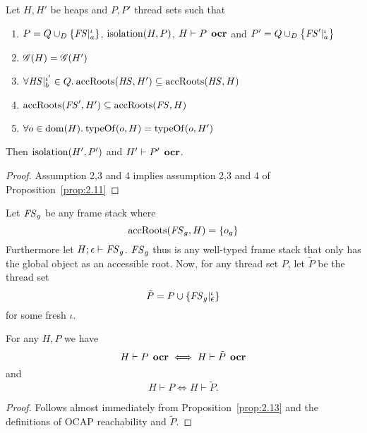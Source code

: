 \begin{corollary} \label{cor:2.11}
  Let $H, H'$ be heaps and $P, P'$ thread sets such that
  \begin{enumerate}
    \item $P = Q \cup_D \left\{ \mathit{FS}|_a^\iota \right\}$, $\mbox{$\mathrm{isolation}$}{(H, P)}$, $H
      \vdash P \:\: \mbox{\bf ocr}$ and $P' = Q \cup_D \left\{ \mathit{FS}'|_a^\iota \right\}$
    \item $\mathscr{G}{(H)} = \mathscr{G}{(H')}$
    \item $\forall \mathit{HS}|_b^{\iota'} \in Q. \: \mbox{$\mathrm{accRoots}$}{(\ensuremath{\mathit{HS}}, H')} \subseteq \mbox{$\mathrm{accRoots}$}{(\ensuremath{\mathit{HS}}, H)}$
    \item $\mbox{$\mathrm{accRoots}$}{(\ensuremath{\mathit{FS}}', H')} \subseteq \mbox{$\mathrm{accRoots}$}{(\ensuremath{\mathit{FS}}, H)}$
    \item $\forall o \in \mbox{$\mathrm{dom}$}{(H)}. \: \mbox{$\mathrm{typeOf}$}{(o, H)} = \mbox{$\mathrm{typeOf}$}{(o, H')}$
  \end{enumerate}
  Then $\mbox{$\mathrm{isolation}$}{(H', P')}$ and $H' \vdash P' \:\: \mbox{\bf ocr}$.
\end{corollary}

\begin{proof}
  Assumption 2,3 and 4 implies assumption 2,3 and 4 of
  Proposition~\ref{prop:2.11}
\end{proof}

\begin{definition} \label{def:ptilde}
  Let $\mathit{FS}_g$ be any frame stack where 
  \begin{equation*}
    \mbox{$\mathrm{accRoots}$}(\mathit{FS}_g, H) = \left\{ o_g \right\}
  \end{equation*}
  Furthermore let $H; \mbox{$\epsilon$} \vdash \mathit{FS}_g$.
  $\mathit{FS}_g$ thus is any well-typed frame stack that only has the global object as
  an accessible root.  Now, for any thread set $P$, let $\tilde{P}$ be the
  thread set
  \begin{equation*}
    \tilde{P} = P \cup \left\{ \mathit{FS}_g|_{\mbox{$\epsilon$}}^\iota \right\}
  \end{equation*}
  for some fresh $\iota$.
\end{definition}

\begin{proposition} \label{prop:ocrtilde_eq}
  For any $H, P$ we have
  \begin{equation*}
    H \vdash P \:\: \mbox{\bf ocr} \iff H \vdash \tilde{P} \:\: \mbox{\bf ocr}
  \end{equation*}
  and
  \begin{equation*}
    H \vdash P  \iff H \vdash \tilde{P}. 
  \end{equation*}
\end{proposition}
\begin{proof}
  Follows almost immediately from Proposition~\ref{prop:2.13} and the
  definitions of OCAP reachability and $\tilde{P}$.
\end{proof}

